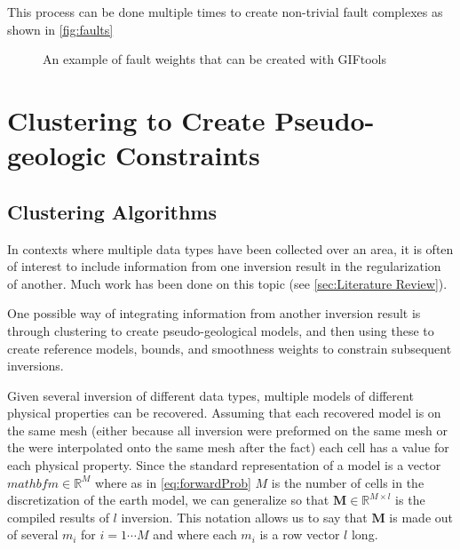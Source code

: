 This process can be done multiple times to create non-trivial fault complexes as shown in \autoref{fig:faults}

\begin{figure} [h]
    \centering
    \caption{An example of fault weights that can be created with GIFtools}
    \label{fig:faults}
\end{figure}
\FloatBarrier

\section{Clustering to Create Pseudo-geologic Constraints}
\label{sec:cluster}

\subsection{Clustering Algorithms}
\label{subsec:clusterAlgo}

In contexts where multiple data types have been collected over an area, it is often of interest to include information from one inversion result in the regularization of another. Much work has been done on this topic (see \autoref{sec:Literature Review}). 

One possible way of integrating information from another inversion result is through clustering to create pseudo-geological models, and then using these to create reference models, bounds, and smoothness weights to constrain subsequent inversions. 

Given several inversion of different data types, multiple models of different physical properties can be recovered. Assuming that each recovered model is on the same mesh (either because all inversion were preformed on the same mesh or the were interpolated onto the same mesh after the fact) each cell has a value for each physical property. Since the standard representation of a model is a vector $mathbf m \in \mathbb R^M$ where as in \autoref{eq:forwardProb} $M$ is the number of cells in the discretization of the earth model, we can generalize so that $\mathbf M \in \mathbb R^{M\times l}$ is the compiled results of $l$ inversion. This notation allows us to say that $\mathbf M$ is made out of several $m_i$ for $i = 1 \cdots M$ and where each $m_i$ is a row vector $l$ long.

